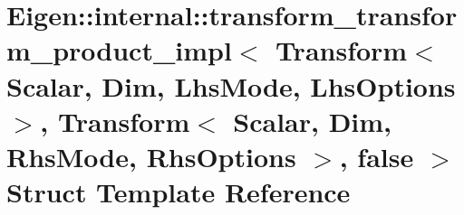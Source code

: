 \hypertarget{struct_eigen_1_1internal_1_1transform__transform__product__impl_3_01_transform_3_01_scalar_00_01fe1fb77c9f6edc527bf418dd10ef65b9}{}\section{Eigen\+::internal\+::transform\+\_\+transform\+\_\+product\+\_\+impl$<$ Transform$<$ Scalar, Dim, Lhs\+Mode, Lhs\+Options $>$, Transform$<$ Scalar, Dim, Rhs\+Mode, Rhs\+Options $>$, false $>$ Struct Template Reference}
\label{struct_eigen_1_1internal_1_1transform__transform__product__impl_3_01_transform_3_01_scalar_00_01fe1fb77c9f6edc527bf418dd10ef65b9}
